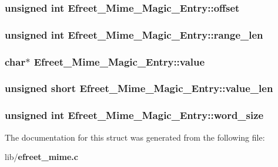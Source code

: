 \subsubsection{\setlength{\rightskip}{0pt plus 5cm}unsigned int {\bf Efreet\_\-Mime\_\-Magic\_\-Entry::offset}}\label{structEfreet__Mime__Magic__Entry_73aa16d088be4f2a3aa03c9ca5eaa618}


\subsubsection{\setlength{\rightskip}{0pt plus 5cm}unsigned int {\bf Efreet\_\-Mime\_\-Magic\_\-Entry::range\_\-len}}\label{structEfreet__Mime__Magic__Entry_00ba29bea2a45e9e10663c4b729e1cbe}


\subsubsection{\setlength{\rightskip}{0pt plus 5cm}char$\ast$ {\bf Efreet\_\-Mime\_\-Magic\_\-Entry::value}}\label{structEfreet__Mime__Magic__Entry_69cb6675e1f792c9174085c8a3af7bc5}


\subsubsection{\setlength{\rightskip}{0pt plus 5cm}unsigned short {\bf Efreet\_\-Mime\_\-Magic\_\-Entry::value\_\-len}}\label{structEfreet__Mime__Magic__Entry_cbc13e36a4511eb1653eb08e37e0667b}


\subsubsection{\setlength{\rightskip}{0pt plus 5cm}unsigned int {\bf Efreet\_\-Mime\_\-Magic\_\-Entry::word\_\-size}}\label{structEfreet__Mime__Magic__Entry_d20d2adb1bc786b041190ee3794ff1ac}




The documentation for this struct was generated from the following file:\begin{CompactItemize}
\item 
lib/{\bf efreet\_\-mime.c}\end{CompactItemize}
